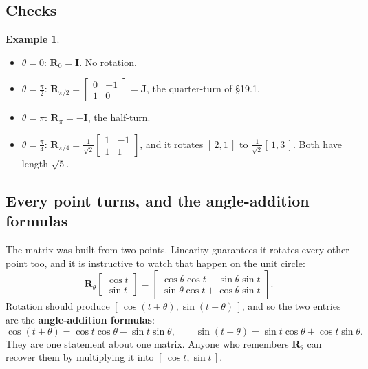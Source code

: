 \documentclass[11pt]{article}
\theoremstyle{plain}
\theoremstyle{definition}
\newtheorem{ex}{Example}[section]
\theoremstyle{remark}
\newcommand{\mt}[1]{\mathbf{#1}}
\begin{document}
\subsection{Checks}
\begin{ex}
\label{ex:rot}
\leavevmode
\begin{itemize}[leftmargin=1.4em,itemsep=3pt]
  \item $\theta=0$: $\mt{R}_0=\mt{I}$. No rotation.
  \item $\theta=\frac{\pi}{2}$: $\mt{R}_{\pi/2}=\begin{bmatrix}0&-1\\1&0\end{bmatrix}=\mt{J}$,
        the quarter-turn of \S19.1.
  \item $\theta=\pi$: $\mt{R}_\pi=-\mt{I}$, the half-turn.
  \item $\theta=\frac{\pi}{4}$: $\mt{R}_{\pi/4}=\frac{1}{\sqrt2}\begin{bmatrix}1&-1\\1&1\end{bmatrix}$,
        and it rotates $[\,2,1\,]$ to $\frac{1}{\sqrt2}[\,1,3\,]$. Both have
        length $\sqrt5$.
\end{itemize}
\end{ex}

\subsection{Every point turns, and the angle-addition formulas}
The matrix was built from two points. Linearity guarantees it rotates every
other point too, and it is instructive to watch that happen on the unit circle:
\[
  \mt{R}_\theta\begin{bmatrix}\cos t\\\sin t\end{bmatrix}
  =\begin{bmatrix}\cos\theta\cos t-\sin\theta\sin t\\
                  \sin\theta\cos t+\cos\theta\sin t\end{bmatrix} .
\]
Rotation should produce $[\,\cos(t+\theta),\sin(t+\theta)\,]$, and so the two
entries are the \textbf{angle-addition formulas}:
\[
  \cos(t+\theta)=\cos t\cos\theta-\sin t\sin\theta,
  \qquad
  \sin(t+\theta)=\sin t\cos\theta+\cos t\sin\theta .
\]
They are one statement about one matrix. Anyone who remembers $\mt{R}_\theta$
can recover them by multiplying it into $[\,\cos t,\sin t\,]$.
\end{document}
